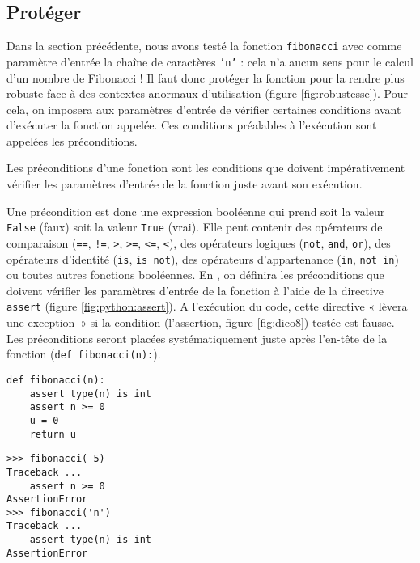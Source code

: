 \subsection{Protéger}
Dans la section précédente, nous avons testé la fonction {\tt fibonacci}
avec comme paramètre d'entrée la chaîne de caractères {\tt 'n'} : 
cela n'a aucun sens pour le calcul d'un nombre de Fibonacci ! Il faut
donc protéger la fonction pour la rendre plus robuste face à des contextes
anormaux d'utilisation (figure \ref{fig:robustesse}). 
Pour cela, on imposera
aux paramètres d'entrée de vérifier certaines conditions avant
d'exécuter la fonction appelée. Ces conditions préalables à l'exécution
sont appelées les préconditions.

\begin{defin}[précondition]
Les préconditions d'une fonction sont les conditions que doivent 
impérativement vérifier les paramètres d'entrée de la fonction
juste avant son exécution.
\end{defin}

Une précondition est donc une expression booléenne qui prend soit la valeur 
{\tt False} (faux) soit la valeur {\tt True} (vrai). 
Elle peut contenir des opérateurs de comparaison ({\tt ==}, {\tt !=}, {\tt >}, {\tt >=}, {\tt <=}, {\tt <}),
des opérateurs logiques ({\tt not}, {\tt and}, {\tt or}), des opérateurs d'identité ({\tt is},
{\tt is not}), des opérateurs d'appartenance ({\tt in}, {\tt not in}) ou toutes autres fonctions booléennes.
En \python, on définira les préconditions que doivent vérifier les paramètres
d'entrée de la fonction à l'aide de la directive {\tt assert} (figure \ref{fig:python:assert}). 
A l'exécution du code, cette directive « lèvera une exception~»
si la condition (l'assertion, figure \ref{fig:dico8}) testée est fausse.
Les préconditions seront placées systématiquement juste après l'en-tête
de la fonction ({\tt def fibonacci(n):}).

\noindent\mbox{}\hspace*{1cm}\begin{py}{6cm}
\begin{verbatim}
def fibonacci(n):
    assert type(n) is int
    assert n >= 0
    u = 0
    return u
\end{verbatim}
\end{py}\hfill
\begin{py}{6cm}
\begin{verbatim}
>>> fibonacci(-5)
Traceback ...
    assert n >= 0
AssertionError
>>> fibonacci('n')
Traceback ...
    assert type(n) is int
AssertionError
\end{verbatim}
\end{py}
\hspace*{1cm}\mbox{}\vspace*{2mm}

